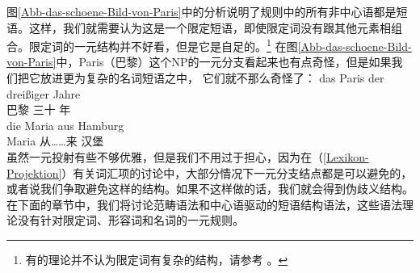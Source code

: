 图\ref{Abb-das-schoene-Bild-von-Paris}中的分析说明了规则中的所有非中心语都是短语。这样，我们就需要认为这是一个限定短语，即使限定词没有跟其他元素相组合。限定词的一元结构并不好看，但是它是自足的。\footnote{%
有的\xbarc 理论并不认为限定词有复杂的结构，请参考 。
}
在图\ref{Abb-das-schoene-Bild-von-Paris}中，Paris（巴黎）这个NP的一元分支看起来也有点奇怪，但是如果我们把它放进更为复杂的名词短语之中， 它们就不那么奇怪了：
\eal
\ex 
\gll das Paris der dreißiger Jahre\\
	  巴黎  三十 年\\
\ex 
\gll die Maria aus Hamburg\\
	  Maria 从……来 汉堡\\
\zl
虽然一元投射有些不够优雅，但是我们不用过于担心，因为在（\ref{Lexikon-Projektion}）有关词汇项的讨论中，大部分情况下一元分支结点都是可以避免的，或者说我们争取避免这样的结构。如果不这样做的话，我们就会得到伪歧义结构。在下面的章节中，我们将讨论范畴语法和中心语驱动的短语结构语法，这些语法理论没有针对限定词、形容词和名词的一元规则。

